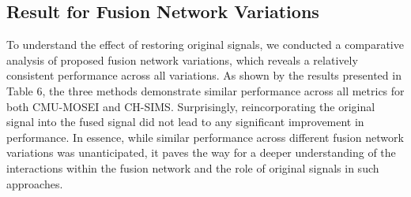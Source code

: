 \documentclass[11pt]{article}
\begin{document}
\subsection{Result for Fusion Network Variations}
To understand the effect of restoring original signals, we conducted a comparative analysis of proposed fusion network variations, which reveals a relatively consistent performance across all variations. As shown by the results presented in Table 6, the three methods demonstrate similar performance across all metrics for both CMU-MOSEI and CH-SIMS. Surprisingly, reincorporating the original signal into the fused signal did not lead to any significant improvement in performance.
In essence, while  similar performance across different fusion network variations was unanticipated, it paves the way for a deeper understanding of the interactions within the fusion network and the role of original signals in such approaches.
\end{document}
